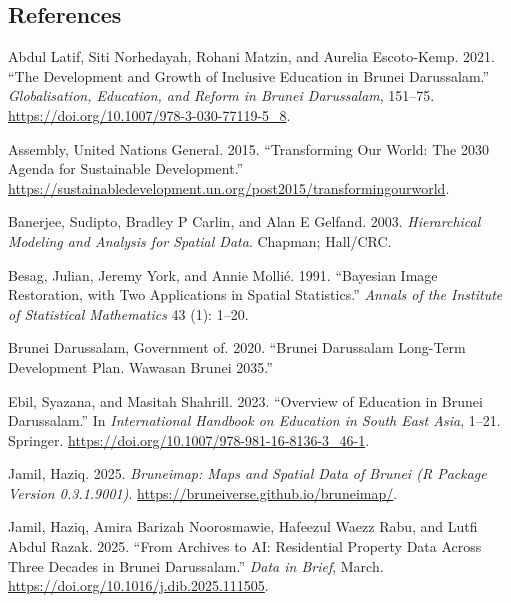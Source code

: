 \documentclass[
  12pt,
]{article}
\newlength{\cslhangindent}
\newenvironment{CSLReferences}[2] %
 {\begin{list}{}{%
  \setlength{\itemindent}{0pt}
  \setlength{\leftmargin}{0pt}
  \setlength{\parsep}{0pt}
  \ifodd #1
   \setlength{\leftmargin}{\cslhangindent}
   \setlength{\itemindent}{-1\cslhangindent}
  \fi
  \setlength{\itemsep}{#2\baselineskip}}}
 {\end{list}}
\begin{document}
\subsection*{References}\label{references}

\label{refs}
\begin{CSLReferences}{1}{0}
Abdul Latif, Siti Norhedayah, Rohani Matzin, and Aurelia Escoto-Kemp.
2021. {``The Development and Growth of Inclusive Education in Brunei
Darussalam.''} \emph{Globalisation, Education, and Reform in Brunei
Darussalam}, 151--75. \url{https://doi.org/10.1007/978-3-030-77119-5_8}.

Assembly, United Nations General. 2015. {``Transforming Our World: The
2030 Agenda for Sustainable Development.''}
\url{https://sustainabledevelopment.un.org/post2015/transformingourworld}.

Banerjee, Sudipto, Bradley P Carlin, and Alan E Gelfand. 2003.
\emph{Hierarchical Modeling and Analysis for Spatial Data}. Chapman;
Hall/CRC.

Besag, Julian, Jeremy York, and Annie Mollié. 1991. {``Bayesian Image
Restoration, with Two Applications in Spatial Statistics.''}
\emph{Annals of the Institute of Statistical Mathematics} 43 (1): 1--20.

Brunei Darussalam, Government of. 2020. {``Brunei Darussalam Long-Term
Development Plan. Wawasan Brunei 2035.''}

Ebil, Syazana, and Masitah Shahrill. 2023. {``Overview of Education in
Brunei Darussalam.''} In \emph{International Handbook on Education in
South East Asia}, 1--21. Springer.
\url{https://doi.org/10.1007/978-981-16-8136-3_46-1}.

Jamil, Haziq. 2025. \emph{Bruneimap: {M}aps and {S}patial {D}ata of
{B}runei ({R} Package Version 0.3.1.9001)}.
\url{https://bruneiverse.github.io/bruneimap/}.

Jamil, Haziq, Amira Barizah Noorosmawie, Hafeezul Waezz Rabu, and Lutfi
Abdul Razak. 2025. {``From {Archives} to {AI:} {Residential} {Property}
{Data} {Across} {Three} {Decades} in {Brunei} {Darussalam}.''}
\emph{Data in Brief}, March.
\url{https://doi.org/10.1016/j.dib.2025.111505}.


\end{CSLReferences}
\end{document}
